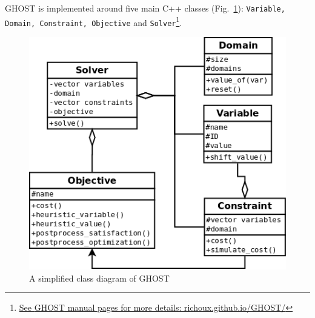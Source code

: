 \documentclass[journal]{IEEEtran}
\newcommand{\ghost}{\textsc{GHOST}\xspace}
\begin{document}
\ghost    is    implemented    around   five    main    C++    classes
(Fig.~\ref{fig:ghost}):    \texttt{Variable,    Domain,    Constraint,
  Objective}                                                       and
\texttt{Solver}\footnote{\href{http://richoux.github.io/GHOST/}{See
    \ghost manual pages for more details: richoux.github.io/GHOST/}}.
\begin{figure}[th]
  \centering
  \includegraphics[width=\columnwidth]{figs/ghost_vert.png}
  \caption{A simplified class diagram of \ghost}
  \label{fig:ghost}
\end{figure}
\end{document}
